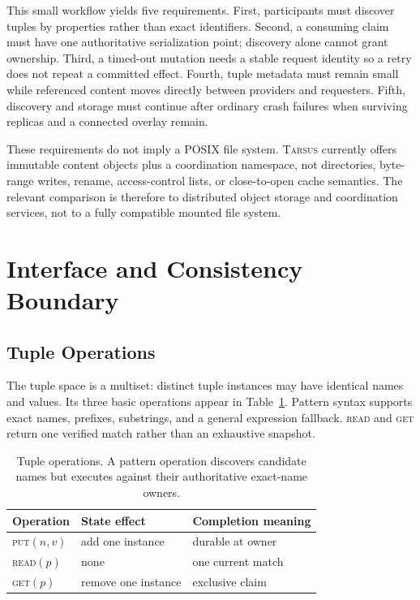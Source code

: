 \documentclass[conference]{IEEEtran}
\newcommand{\system}{\textsc{Tarsus}\xspace}
\newcommand{\putop}{\textsc{put}\xspace}
\newcommand{\readop}{\textsc{read}\xspace}
\newcommand{\getop}{\textsc{get}\xspace}
\begin{document}
This small workflow yields five requirements. First, participants must discover
tuples by properties rather than exact identifiers. Second, a consuming claim
must have one authoritative serialization point; discovery alone cannot grant
ownership. Third, a timed-out mutation needs a stable request identity so a
retry does not repeat a committed effect. Fourth, tuple metadata must remain
small while referenced content moves directly between providers and
requesters. Fifth, discovery and storage must continue after ordinary crash
failures when surviving replicas and a connected overlay remain.

These requirements do not imply a POSIX file system. \system currently offers
immutable content objects plus a coordination namespace, not directories,
byte-range writes, rename, access-control lists, or close-to-open cache
semantics. The relevant comparison is therefore to distributed object storage
and coordination services, not to a fully compatible mounted file system.

\section{Interface and Consistency Boundary}
\label{sec:semantics}

\subsection{Tuple Operations}

The tuple space is a multiset: distinct tuple instances may have identical
names and values. Its three basic operations appear in
Table~\ref{tab:operations}. Pattern syntax supports exact names, prefixes,
substrings, and a general expression fallback. \readop and \getop return one
verified match rather than an exhaustive snapshot.

\begin{table}[t]
\caption{Tuple operations. A pattern operation discovers candidate names but
executes against their authoritative exact-name owners.}
\label{tab:operations}
\centering
\begin{tabular}{@{}lll@{}}
\toprule
Operation & State effect & Completion meaning \\
\midrule
\putop$(n,v)$ & add one instance & durable at owner \\
\readop$(p)$ & none & one current match \\
\getop$(p)$ & remove one instance & exclusive claim \\
\bottomrule
\end{tabular}
\end{table}
\end{document}
